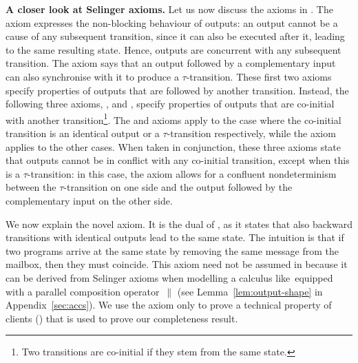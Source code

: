 {\bfseries A closer look at Selinger axioms.}
Let us now discuss the axioms in .
The \outputcommutativity axiom expresses the non-blocking behaviour of
outputs: %
an output cannot be a cause of any subsequent transition, since it can
also be executed after it, leading to the same resulting state. Hence,
outputs are concurrent with any subsequent transition.  The
\outputfeedback axiom says that an output followed by a complementary
input can also synchronise with it to produce a $\tau$-transition.
These first
two axioms specify properties of outputs that are followed by another
transition. Instead, the following three axioms, \outputconfluence,
\outputdeterminacy and \outputtau, specify properties of outputs that
are co-initial with another transition\footnote{Two transitions are
  co-initial if they stem from the same state.}. The
\outputdeterminacy and \outputtau axioms apply to the case where the
co-initial transition is an identical output or a $\tau$-transition
respectively, while the \outputconfluence axiom applies to the other
cases.  When taken in conjunction, these three axioms state that outputs
cannot be in conflict %
with any co-initial transition, except when this is a
$\tau$-transition: in this case, the \outputtau axiom allows for a
confluent nondeterminism between the $\tau$-transition on one side and
the output followed by the complementary input on the other side.




We now explain the novel \outputdeterminacyinv axiom.  It is the dual of \outputdeterminacy, as it states that also backward transitions with identical outputs lead to the same state. The intuition is that if two programs arrive at the same state by removing the same message from the mailbox, then they must coincide. %
This axiom need not be assumed in \cite{DBLP:conf/concur/Selinger97} because it can be derived from Selinger axioms when modelling a calculus like~\ACCS equipped with a parallel composition operator~$\parallel$ (see Lemma~\ref{lem:output-shape} in Appendix~\ref{sec:accs}).  We use the \outputdeterminacyinv axiom only to prove a technical property of clients () that is used to prove our completeness result.
